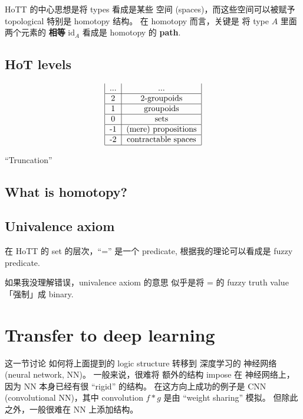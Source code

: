 HoTT 的中心思想是将 types 看成是某些 空间 (spaces)，而这些空间可以被赋予 topological 特别是 homotopy 结构。 在 homotopy 而言，关键是 将 type $A$ 里面两个元素的 \textbf{相等} $\mathrm{id}_A$ 看成是 homotopy 的 \textbf{path}.

\subsection{HoT levels}

\begin{equation}
\begin{tabular}{|c|c|}
	... & ... \\ 
	\hline 
	2 & 2-groupoids \\ 
	\hline 
	1 & groupoids \\ 
	\hline 
	0 & sets \\ 
	\hline 
	-1 & (mere) propositions \\ 
	\hline 
	-2 & contractable spaces \\ 
	\hline 
\end{tabular} 
\end{equation}

``Truncation''

\subsection{What is homotopy?}

\subsection{Univalence axiom}

在 HoTT 的 set 的层次，``='' 是一个 predicate, 根据我的理论可以看成是 fuzzy predicate.

如果我没理解错误，univalence axiom 的意思 似乎是将 = 的 fuzzy truth value「强制」成 binary.

\section{Transfer to deep learning}

这一节讨论 如何将上面提到的 logic structure 转移到 深度学习的 神经网络 (neural network, NN)。  一般来说，很难将 额外的结构 impose 在 神经网络上，因为 NN 本身已经有很 ``rigid'' 的结构。 在这方向上成功的例子是 CNN (convolutional NN)，其中 convolution $f * g$ 是由 ``weight sharing'' 模拟。 但除此之外，一般很难在 NN 上添加结构。

